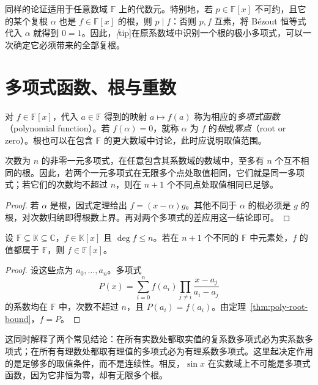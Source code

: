 同样的论证适用于任意数域 $\mathbb F$ 上的代数元。特别地，若 $p\in\mathbb F[x]$ 不可约，且它的某个复根 $\alpha$ 也是 $f\in\mathbb F[x]$ 的根，则 $p\mid f$：否则 $p,f$ 互素，将 Bézout 恒等式代入 $\alpha$ 就得到 $0=1$。因此，\emph[tip]{在原系数域中识别一个根的极小多项式，可以一次确定它必须带来的全部复根}。

\section{多项式函数、根与重数}
\label{sec:poly-roots}

\begin{definition}
对 $f\in\mathbb F[x]$，代入 $a\in\mathbb F$ 得到的映射 $a\mapsto f(a)$ 称为相应的\emph{多项式函数}（polynomial function）。若 $f(\alpha)=0$，就称 $\alpha$ 为 $f$ 的\emph{根}或\emph{零点}（root or zero）。根也可以在包含 $\mathbb F$ 的更大数域中讨论，此时应说明取值范围。
\end{definition}

\begin{theorem}
\label{thm:poly-root-bound}
次数为 $n$ 的非零一元多项式，在任意包含其系数域的数域中，至多有 $n$ 个互不相同的根。因此，若两个一元多项式在无限多个点处取值相同，它们就是同一多项式；若它们的次数均不超过 $n$，则在 $n+1$ 个不同点处取值相同已足够。
\end{theorem}
\begin{proof}
若 $\alpha$ 是根，因式定理给出 $f=(x-\alpha)g$。其他不同于 $\alpha$ 的根必须是 $g$ 的根，对次数归纳即得根数上界。再对两个多项式的差应用这一结论即可。
\end{proof}

\begin{proposition}
\label{prop:poly-values-field}
设 $\mathbb F\subseteq\mathbb K\subseteq\mathbb C$，$f\in\mathbb K[x]$ 且 $\deg f\leq n$。若在 $n+1$ 个不同的 $\mathbb F$ 中元素处，$f$ 的值都属于 $\mathbb F$，则 $f\in\mathbb F[x]$。
\end{proposition}
\begin{proof}
设这些点为 $a_0,\ldots,a_n$。多项式
\[
    P(x)=\sum_{i=0}^n f(a_i)
    \prod_{j\ne i}\frac{x-a_j}{a_i-a_j}
\]
的系数均在 $\mathbb F$ 中，次数不超过 $n$，且 $P(a_i)=f(a_i)$。由定理~\ref{thm:poly-root-bound}，$f=P$。
\end{proof}

这同时解释了两个常见结论：在所有实数处都取实值的复系数多项式必为实系数多项式；在所有有理数处都取有理值的多项式必为有理系数多项式。这里起决定作用的是足够多的取值条件，而不是连续性。相反，$\sin x$ 在实数域上不可能是多项式函数，因为它非恒为零，却有无限多个根。

